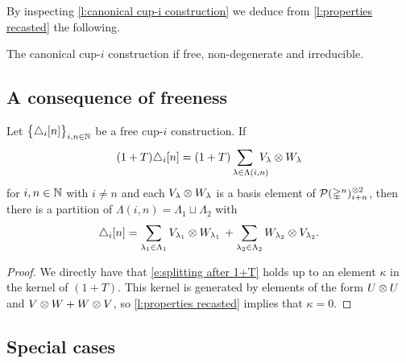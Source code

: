 By inspecting \cref{l:canonical cup-i construction} we deduce from \cref{l:properties recasted} the following.

\begin{theorem} \label{t:existence}
	The canonical \mbox{cup-$i$} construction if free, non-degenerate and irreducible.
\end{theorem}



\subsection{A consequence of freeness} \label{ss:consequence}

\begin{lemma} \label{l:splitting of summands}
	Let $\big\{ \triangle_i [n] \big\}_{i,n\in\mathbb{N}}$ be a free \mbox{cup-$i$} construction.
	If
	\[
	(1+T) \triangle_i [n] =
	(1+T) \sum_{\lambda \in \Lambda(i,n) \kern-10pt} V_\lambda \ot W_\lambda
	\]
	for $i,n \in \mathbb{N}$ with $i \neq n$ and each $V_\lambda \otimes W_\lambda$ is a basis element of $\mathcal{P}(\mathbb{\Delta}^n)^{\otimes 2}_{i+n}$, then there is a partition of $\Lambda(i,n) = \Lambda_1 \sqcup \Lambda_2$ with
	\begin{equation} \label{e:splitting after 1+T}
	\triangle_i [n] =
	\sum_{\lambda_1 \in \Lambda_1} V_{\lambda_1} \otimes W_{\lambda_1} \, +
	\sum_{\lambda_2 \in \Lambda_2} W_{\lambda_2} \otimes V_{\lambda_2}.
	\end{equation}
\end{lemma}

\begin{proof}
	We directly have that \eqref{e:splitting after 1+T} holds up to an element $\kappa$ in the kernel of $(1+T)$.
	This kernel is generated by elements of the form $U \otimes U$ and $V \otimes W + W \otimes V$, so \cref{l:properties recasted} implies that $\kappa = 0$.
\end{proof}

\subsection{Special cases} \label{ss:cases}

